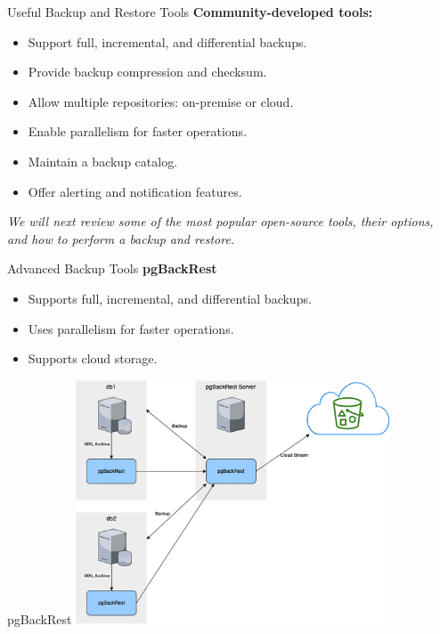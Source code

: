 \documentclass[aspectratio=169]{beamer}
\begin{document}
\begin{frame}{Useful Backup and Restore Tools}
    \textbf{Community-developed tools:}
    \begin{itemize}
        \item Support full, incremental, and differential backups.
        \item Provide backup compression and checksum.
        \item Allow multiple repositories: on-premise or cloud.
        \item Enable parallelism for faster operations.
        \item Maintain a backup catalog.
        \item Offer alerting and notification features.
    \end{itemize}

    \textit{We will next review some of the most popular open-source tools, their options, and how to perform a backup and restore.}
\end{frame}

\begin{frame}{Advanced Backup Tools}
    \textbf{pgBackRest}
    \begin{itemize}
        \item Supports full, incremental, and differential backups.
        \item Uses parallelism for faster operations.
        \item Supports cloud storage.
    \end{itemize}
\end{frame}

\begin{frame}{pgBackRest}
    \centering
    \includegraphics[width=0.7\textwidth]{figures/pgbackrest}
\end{frame}
\end{document}
